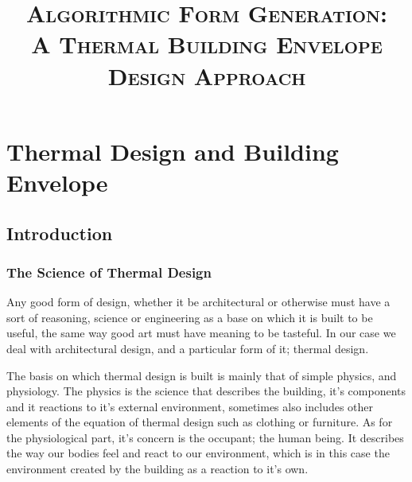 \documentclass[a4paper,twoside,12pt,openright,final,oldfontcommands]{memoir}
\title{\textsc{Algorithmic Form Generation:\\
\large A Thermal Building Envelope Design Approach}}
\author{}
\date{}
\begin{document}
\pagestyle{ruled}

\maketitle





\newpage
\tableofcontents

\newpage
\listoffigures
\listoftables


\chapter{Thermal Design and Building Envelope}
\section{Introduction}

\subsection{The Science of Thermal Design}
Any good form of design, whether it be architectural or otherwise must have a sort of reasoning,
science or engineering as a base on which it is built to be useful, the same way good art must have
meaning to be tasteful. In our case we deal with architectural design, and a particular form of it;
thermal design.

The basis on which thermal design is built is mainly that of simple physics, and physiology. The
physics is the science that describes the building, it's components and it reactions to it's
external environment, sometimes also includes other elements of the equation of thermal design such
as clothing or furniture. As for the physiological part, it's concern is the occupant; the human
being. It describes the way our bodies feel and react to our environment, which is in this case the
environment created by the building as a reaction to it's own.
\end{document}
